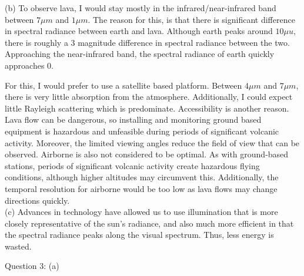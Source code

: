 \documentclass{homework}
\begin{document}
(b)
To observe lava, I would stay mostly in the infrared/near-infrared band between $7 \mu m$ and $1 \mu m$. The reason for this, is that there is significant difference in spectral radiance between earth and lava. Although earth peaks around $10 \mu u$, there is roughly a 3 magnitude difference in spectral radiance between the two. Approaching the near-infrared band, the spectral radiance of earth quickly approaches 0. 

For this, I would prefer to use a satellite based platform. Between $4 \mu m$ and $7 \mu m$, there is very little absorption from the atmosphere. Additionally, I could expect little Rayleigh scattering which is predominate. Accessibility is another reason. Lava flow can be dangerous, so installing and monitoring ground based equipment is hazardous and unfeasible during periods of significant volcanic activity. Moreover, the limited viewing angles reduce the field of view that can be observed. Airborne is also not considered to be optimal. As with ground-based stations, periods of significant volcanic activity create hazardous flying conditions, although higher altitudes may circumvent this. Additionally, the temporal resolution for airborne would be too low as lava flows may change directions quickly. \\

(c)
Advances in technology have allowed us to use illumination that is more closely representative of the sun's radiance, and also much more efficient in that the spectral radiance peaks along the visual spectrum. Thus, less energy is wasted.


Question 3:
(a)
\end{document}
